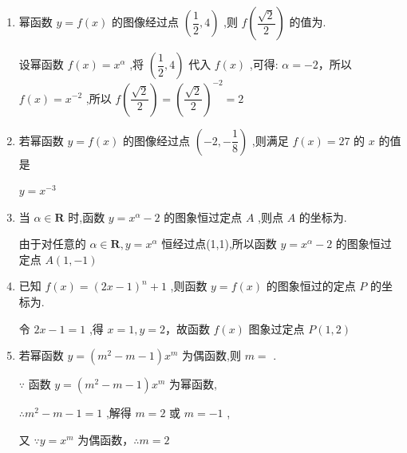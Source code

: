 \begin{enumerate}
\begin{jieda}
        又因为函数图像关于 $y$ 轴对称,则 $a$ 为偶数,所以 $a =  - 2$ .
    \end{jieda}
    \item 幂函数 $y = f\left( x\right)$ 的图像经过点 $\left( {\dfrac{1}{2},4}\right)$ ,则 $f\left( \dfrac{\sqrt{2}}{2}\right)$ 的值为.
    \begin{jieda}
        设幂函数 $f\left( x\right)  = {x}^{\alpha }$ ,将 $\left( {\dfrac{1}{2},4}\right)$ 代入 $f\left( x\right)$ ,可得: $\alpha  =  - 2$，所以 $f\left( x\right)  = {x}^{-2}$ ,所以 $f\left( \dfrac{\sqrt{2}}{2}\right)  = {\left( \dfrac{\sqrt{2}}{2}\right) }^{-2} = 2$
    \end{jieda}
    \item 若幂函数 $y = f\left( x\right)$ 的图像经过点 $\left( {-2, - \dfrac{1}{8}}\right)$ ,则满足 $f\left( x\right)  = {27}$ 的 $x$ 的值是
    \begin{jieda}
        $y = x^{-3}$
    \end{jieda}
    \item 当 $\alpha  \in  \mathbf{R}$ 时,函数 $y = {x}^{\alpha } - 2$ 的图象恒过定点 $A$ ,则点 $A$ 的坐标为.
    \begin{jieda}
        由于对任意的 $\alpha  \in  \mathbf{R},y = {x}^{\alpha }$ 恒经过点(1,1),所以函数 $y = {x}^{\alpha } - 2$ 的图象恒过定点 $A\left( {1, - 1}\right)$ 
    \end{jieda}
    
    \item 已知 $f\left( x\right)  = {\left( 2x - 1\right) }^{n} + 1$ ,则函数 $y = f\left( x\right)$ 的图象恒过的定点 $P$ 的坐标为.
    \begin{jieda}
        令 ${2x} - 1 = 1$ ,得 $x = 1,y = 2$，故函数 $f\left( x\right)$ 图象过定点 $P\left( {1,2}\right)$
    \end{jieda}
    
    \item 若幂函数 $y = \left( {{m}^{2} - m - 1}\right) {x}^{m}$ 为偶函数,则 $m =$ .
    \begin{jieda}
        $\because$ 函数 $y = \left( {{m}^{2} - m - 1}\right) {x}^{m}$ 为幂函数,
        
        $\therefore {m}^{2} - m - 1 = 1$ ,解得 $m = 2$ 或 $m =  - 1$ ,
        
        又 $\because y = {x}^{m}$ 为偶函数，$\therefore m = 2$
    \end{jieda}
    

\end{enumerate}
